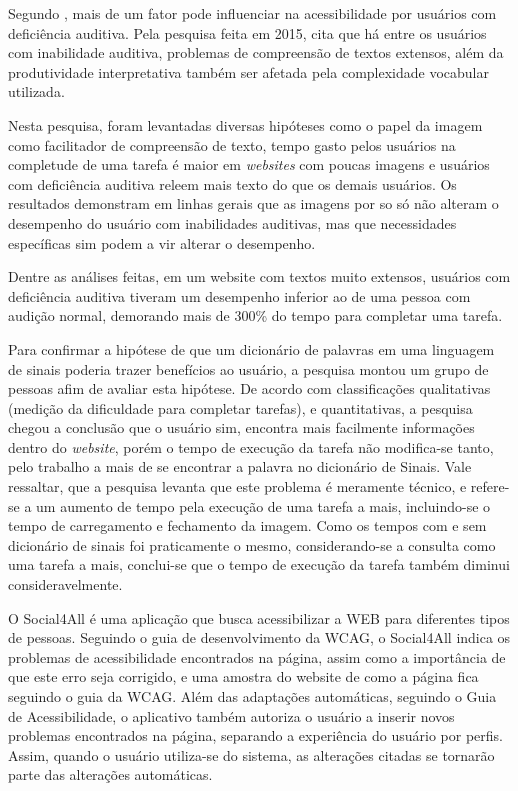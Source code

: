 \documentclass[
	12pt,				%
	oneside,			%
	a4paper,			%
	english,			%
	brazil				%
	]{abntex2ppgsi}
\begin{document}
Segundo , mais de um fator pode influenciar na acessibilidade por usuários com deficiência auditiva. Pela pesquisa feita em 2015,  cita que há entre os usuários com inabilidade auditiva, problemas de compreensão de textos extensos, além da produtividade interpretativa também ser afetada pela complexidade vocabular utilizada. 

Nesta pesquisa, foram levantadas diversas hipóteses como o papel da imagem como facilitador de compreensão de texto, tempo gasto pelos usuários na completude de uma tarefa é maior em \textit{websites} com poucas imagens e usuários com deficiência auditiva releem mais texto do que os demais usuários. Os resultados demonstram em linhas gerais que as imagens por so só não alteram o desempenho do usuário com inabilidades auditivas, mas que necessidades específicas sim podem a vir alterar o desempenho.

Dentre as análises feitas, em um website com textos muito extensos, usuários com deficiência auditiva tiveram um desempenho inferior ao de uma pessoa com audição normal, demorando mais de 300\% do tempo para completar uma tarefa. 

Para confirmar a hipótese de que um dicionário de palavras em uma linguagem de sinais poderia trazer benefícios ao usuário, a pesquisa montou um grupo de pessoas afim de avaliar esta hipótese. De acordo com classificações qualitativas (medição da dificuldade para completar tarefas), e quantitativas, a pesquisa chegou a conclusão que o usuário sim, encontra mais facilmente informações dentro do \textit{website}, porém o tempo de execução da tarefa não modifica-se tanto, pelo trabalho a mais de se encontrar a palavra no dicionário de Sinais. Vale ressaltar, que a pesquisa levanta que este problema é meramente técnico, e refere-se a um aumento de tempo pela execução de uma tarefa a mais, incluindo-se o tempo de carregamento e fechamento da imagem. Como os tempos com e sem dicionário de sinais foi praticamente o mesmo, considerando-se a consulta como uma tarefa a mais, conclui-se que o tempo de execução da tarefa também diminui consideravelmente.


O Social4All \cite{social_all} é uma aplicação que busca acessibilizar a WEB para diferentes tipos de pessoas. Seguindo o guia de desenvolvimento da WCAG, o Social4All indica os problemas de acessibilidade encontrados na página, assim como a importância de que este erro seja corrigido, e uma amostra do website de como a página fica seguindo o guia da WCAG. Além das adaptações automáticas, seguindo o Guia de Acessibilidade, o aplicativo também autoriza o usuário a inserir novos problemas encontrados na página, separando a experiência do usuário por perfis. Assim, quando o usuário utiliza-se do sistema, as alterações citadas se tornarão parte das alterações automáticas.
\end{document}
